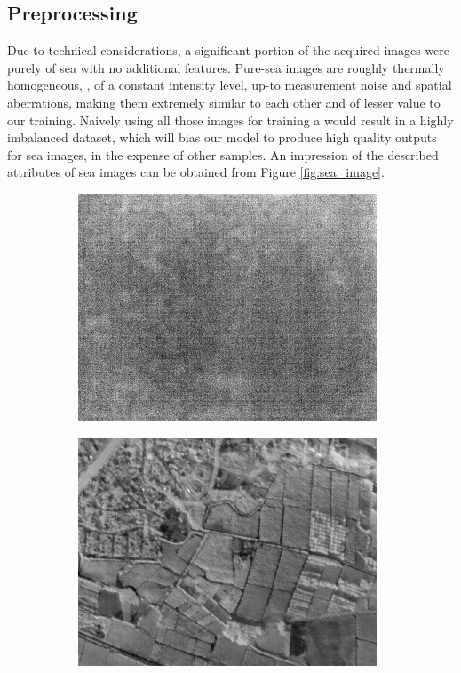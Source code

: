 \documentclass[10pt,twocolumn,letterpaper]{article}
\begin{document}
\subsection{Preprocessing}
Due to technical considerations, a significant portion of the acquired images were purely of sea with no additional features.
Pure-sea images are roughly thermally homogeneous, \ie, of a constant intensity level, up-to measurement noise and spatial aberrations, making them extremely similar to each other and of lesser value to our training.
Naively using all those images for training a would result in a highly imbalanced dataset, which will bias our model to produce high quality outputs for sea images, in the expense of other samples.
An impression of the described attributes of sea images can be obtained from Figure \ref{fig:sea_image}.
\begin{figure}[ht]
    \begin{subfigure}[b]{0.23\textwidth}
        \centering
        \includegraphics[width=\textwidth]{../figs/data/sea.png}
        \label{fig:sea}
    \end{subfigure}
    \hfill
    \begin{subfigure}[b]{0.23\textwidth}
        \centering
        \includegraphics[width=\textwidth]{../figs/data/land.png}

\end{subfigure}
\end{figure}
\end{document}
